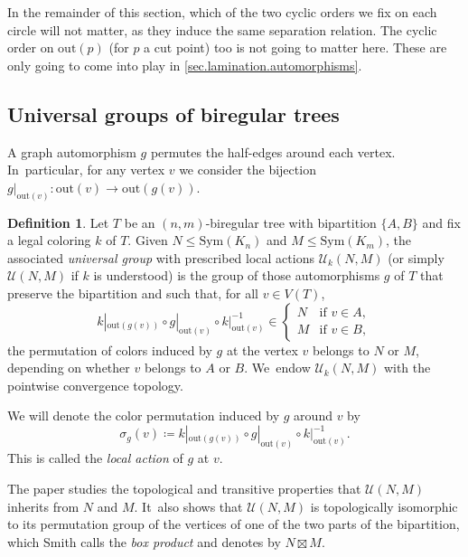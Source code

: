 \documentclass[JEP,XML,SOM,Unicode,NoFloatCountersInSection,published]{cedram}
\theoremstyle{plain}
\theoremstyle{definition}
\newtheorem{definition}[theorem]{Definition}
\theoremstyle{remark}
\newcommand{\Sym}{\mathrm{Sym}}
\newcommand{\U}{\mathcal{U}}
\begin{document}
In the remainder of this section, which of the two cyclic orders we fix on each circle will not matter, as they induce the same separation relation.
The cyclic order on $\mathrm{out}(p)$ (for $p$ a cut point) too is not going to matter here.
These are only going to come into play in \cref{sec.lamination.automorphisms}.

\subsection{Universal groups of biregular trees}
\label{sub.universal.groups}

A graph automorphism $g$ permutes the half-edges around each vertex. In~particular, for any vertex $v$ we consider the bijection $g|_{\mathrm{out}(v)} \colon \mathrm{out}(v) \to \mathrm{out}(g(v))$.

\begin{definition}
\label{def.universal.group}
Let $T$ be an $(n,m)$-biregular tree with bipartition $\{A, B\}$ and fix a legal coloring $k$ of $T$.
Given $N \leq \Sym(K_n)$ and $M \leq \Sym(K_m)$, the associated \emph{universal group} with prescribed local actions $\U_k (N,M)$ (or simply $\U (N,M)$ if $k$ is understood) is the group of those automorphisms $g$ of $T$ that preserve the bipartition and such that, for all $v \in V(T)$,\vspace*{-3pt}
\begin{equation}
k|_{\mathrm{out}(g(v))} \circ g|_{\mathrm{out}(v)} \circ k|_{\mathrm{out}(v)}^{-1} \in
\begin{cases}
N & \text{if $v \in A$},\\
M & \text{if $v \in B$},
\end{cases}
\end{equation}
\ie the permutation of colors induced by $g$ at the vertex $v$ belongs to $N$ or $M$, depending on whether $v$ belongs to $A$ or $B$. We~endow $\U_k(N,M)$ with the pointwise convergence topology.
\end{definition}

We will denote the color permutation induced by $g$ around $v$ by\vspace*{-3pt}
\[
 \sigma_g(v) \coloneqq k|_{\mathrm{out}(g(v))} \circ g|_{\mathrm{out}(v)} \circ k|_{\mathrm{out}(v)}^{-1}. 
\]
This is called the \emph{local action} of $g$ at $v$.

The paper \cite{biregular} studies the topological and transitive properties that $\U(N,M)$ inherits from $N$ and $M$. It~also shows that $\U(N,M)$ is topologically isomorphic to its permutation group of the vertices of one of the two parts of the bipartition, which Smith calls the \textit{box product} and denotes by $N \boxtimes M$.
\end{document}

